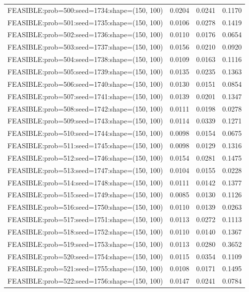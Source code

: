 \begin{longtable}{lccc}
FEASIBLE:prob=500:seed=1734:shape=(150, 100) & 0.0204 & 0.0241 & 0.1170 \\
FEASIBLE:prob=501:seed=1735:shape=(150, 100) & 0.0106 & 0.0278 & 0.1419 \\
FEASIBLE:prob=502:seed=1736:shape=(150, 100) & 0.0110 & 0.0176 & 0.0654 \\
FEASIBLE:prob=503:seed=1737:shape=(150, 100) & 0.0156 & 0.0210 & 0.0920 \\
FEASIBLE:prob=504:seed=1738:shape=(150, 100) & 0.0109 & 0.0163 & 0.1116 \\
FEASIBLE:prob=505:seed=1739:shape=(150, 100) & 0.0135 & 0.0235 & 0.1363 \\
FEASIBLE:prob=506:seed=1740:shape=(150, 100) & 0.0130 & 0.0151 & 0.0854 \\
FEASIBLE:prob=507:seed=1741:shape=(150, 100) & 0.0139 & 0.0201 & 0.1347 \\
FEASIBLE:prob=508:seed=1742:shape=(150, 100) & 0.0111 & 0.0198 & 0.0278 \\
FEASIBLE:prob=509:seed=1743:shape=(150, 100) & 0.0114 & 0.0339 & 0.1271 \\
FEASIBLE:prob=510:seed=1744:shape=(150, 100) & 0.0098 & 0.0154 & 0.0675 \\
FEASIBLE:prob=511:seed=1745:shape=(150, 100) & 0.0098 & 0.0129 & 0.1316 \\
FEASIBLE:prob=512:seed=1746:shape=(150, 100) & 0.0154 & 0.0281 & 0.1475 \\
FEASIBLE:prob=513:seed=1747:shape=(150, 100) & 0.0104 & 0.0155 & 0.0228 \\
FEASIBLE:prob=514:seed=1748:shape=(150, 100) & 0.0111 & 0.0142 & 0.1377 \\
FEASIBLE:prob=515:seed=1749:shape=(150, 100) & 0.0085 & 0.0130 & 0.1126 \\
FEASIBLE:prob=516:seed=1750:shape=(150, 100) & 0.0110 & 0.0139 & 0.0263 \\
FEASIBLE:prob=517:seed=1751:shape=(150, 100) & 0.0113 & 0.0272 & 0.1113 \\
FEASIBLE:prob=518:seed=1752:shape=(150, 100) & 0.0110 & 0.0140 & 0.1367 \\
FEASIBLE:prob=519:seed=1753:shape=(150, 100) & 0.0113 & 0.0280 & 0.3652 \\
FEASIBLE:prob=520:seed=1754:shape=(150, 100) & 0.0115 & 0.0354 & 0.1109 \\
FEASIBLE:prob=521:seed=1755:shape=(150, 100) & 0.0108 & 0.0171 & 0.1495 \\
FEASIBLE:prob=522:seed=1756:shape=(150, 100) & 0.0147 & 0.0241 & 0.0784 \\

\end{longtable}
